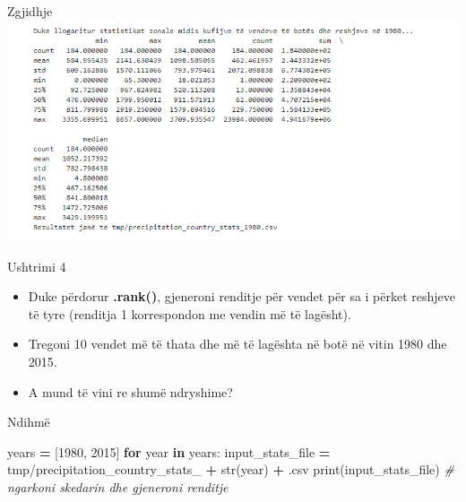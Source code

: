 \documentclass[
  ignorenonframetext,
]{beamer}
\newenvironment{Shaded}{\begin{snugshade}}{\end{snugshade}}
\newcommand{\BuiltInTok}[1]{#1}
\newcommand{\CommentTok}[1]{\textcolor[rgb]{0.56,0.35,0.01}{\textit{#1}}}
\newcommand{\ControlFlowTok}[1]{\textcolor[rgb]{0.13,0.29,0.53}{\textbf{#1}}}
\newcommand{\DecValTok}[1]{\textcolor[rgb]{0.00,0.00,0.81}{#1}}
\newcommand{\KeywordTok}[1]{\textcolor[rgb]{0.13,0.29,0.53}{\textbf{#1}}}
\newcommand{\NormalTok}[1]{#1}
\newcommand{\OperatorTok}[1]{\textcolor[rgb]{0.81,0.36,0.00}{\textbf{#1}}}
\newcommand{\StringTok}[1]{\textcolor[rgb]{0.31,0.60,0.02}{#1}}
\begin{document}
\begin{frame}{Zgjidhje}
\protect\hypertarget{zgjidhje-9}{}
\includegraphics{./Figs/rezultate.png}
\end{frame}

\begin{frame}{Ushtrimi 4}
\protect\hypertarget{ushtrimi-4}{}
\begin{itemize}
\item
  Duke përdorur \textbf{.rank()}, gjeneroni renditje për vendet për sa i
  përket reshjeve të tyre (renditja 1 korrespondon me vendin më të
  lagësht).
\item
  Tregoni 10 vendet më të thata dhe më të lagështa në botë në vitin 1980
  dhe 2015.
\item
  A mund të vini re shumë ndryshime?
\end{itemize}
\end{frame}

\begin{frame}[fragile]{Ndihmë}
\protect\hypertarget{ndihmuxeb-2}{}

\begin{Shaded}
\begin{Highlighting}[]
\NormalTok{years }\OperatorTok{=}\NormalTok{ [}\DecValTok{1980}\NormalTok{, }\DecValTok{2015}\NormalTok{]}
\ControlFlowTok{for}\NormalTok{ year }\KeywordTok{in}\NormalTok{ years:}
\NormalTok{    input\_stats\_file }\OperatorTok{=} \StringTok{\textquotesingle{}tmp/precipitation\_country\_stats\_\textquotesingle{}} \OperatorTok{+} \BuiltInTok{str}\NormalTok{(year) }\OperatorTok{+} \StringTok{\textquotesingle{}.csv\textquotesingle{}}
    \BuiltInTok{print}\NormalTok{(input\_stats\_file)}
    \CommentTok{\# ngarkoni skedarin dhe gjeneroni renditje}
\end{Highlighting}
\end{Shaded}
\end{frame}
\end{document}
